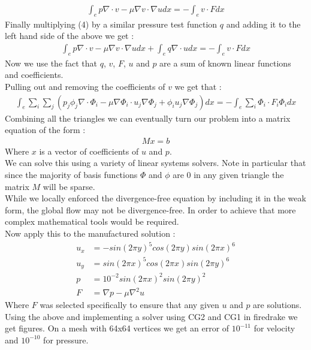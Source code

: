 \documentclass[11pt,twoside,a4paper]{article}
\begin{document}
\begin{align*}
\int_{e} p \nabla \cdot v - \mu \nabla v \cdot \nabla u dx = -\int_{e} v \cdot F dx
\end{align*}
Finally multiplying (4) by a similar pressure test function $q$ and adding it to the left hand side of the above we get :
\begin{align}
\int_{e} p \nabla \cdot v - \mu \nabla v \cdot \nabla u dx + \int_{e} q \nabla \cdot u dx = -\int_{e} v \cdot F dx
\end{align}
Now we use the fact that $q$, $v$, $F$, $u$ and $p$ are a sum of known linear functions and coefficients.\\
Pulling out and removing the coefficients of $v$ we get that :
\begin{align*}
 \int_{e} \sum_i \sum_j (  p_j \phi_j \nabla  \cdot \Phi_i - \mu \nabla \Phi_i \cdot u_j \nabla \Phi_j +   \phi_i u_j \nabla \Phi_j) dx = -\int_{e} \sum_i \Phi_i \cdot F_i \Phi_i dx
\end{align*}
Combining all the triangles we can eventually turn our problem into a matrix equation of the form :
\begin{align}
M x = b
\end{align}
Where $x$ is a vector of coefficients of $u$ and $p$.\\
We can solve this using a variety of linear systems solvers. Note in particular that since the majority of basis functions $\Phi$ and $\phi$ are $0$ in any given triangle the matrix $M$ will be sparse.\\
While we locally enforced the divergence-free equation by including it in the weak form, the global flow may not be divergence-free. In order to achieve that more complex mathematical tools would be required.\\
Now apply this to the manufactured solution :
\begin{align*}
u_x &=  -sin(2 \pi y)^5 cos(2 \pi y)  sin(2 \pi x)^6 \\
u_y &= sin(2 \pi x)^5 cos(2 \pi x)  sin(2 \pi y)^6 \\
p &= 10^{-2} sin(2 \pi x)^2 sin(2 \pi y)^2 \\
F &= \nabla p - \mu \nabla^2 u
\end{align*}
Where $F$ was selected specifically to ensure that any given $u$ and $p$ are solutions.
Using the above and implementing a solver using CG2 and CG1 in firedrake we get figures. On a mesh with 64x64 vertices we get an error of $10^{-11}$ for velocity and $10^{-10}$ for pressure.\\
\end{document}
